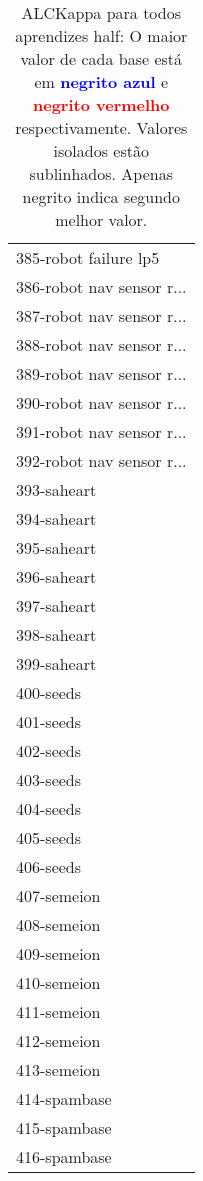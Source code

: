 \begin{table}[h]
\caption{ALCKappa para todos aprendizes half: O maior valor de cada base está em \textcolor{blue}{\textbf{negrito azul}} e \textcolor{red}{\textbf{negrito vermelho}} respectivamente. Valores isolados estão sublinhados. Apenas negrito indica segundo melhor valor.}
\begin{center}\begin{tabular}{l}
 & \\ \hline 385-robot failure lp5 &  \\
386-robot nav sensor r... &  \\
387-robot nav sensor r... &  \\
388-robot nav sensor r... &  \\
389-robot nav sensor r... &  \\
390-robot nav sensor r... &  \\
391-robot nav sensor r... &  \\ \hline
392-robot nav sensor r... &  \\
393-saheart &  \\
394-saheart &  \\
395-saheart &  \\
396-saheart &  \\
397-saheart &  \\
398-saheart &  \\ \hline
399-saheart &  \\
400-seeds &  \\
401-seeds &  \\
402-seeds &  \\
403-seeds &  \\
404-seeds &  \\
405-seeds &  \\ \hline
406-seeds &  \\
407-semeion &  \\
408-semeion &  \\
409-semeion &  \\
410-semeion &  \\
411-semeion &  \\
412-semeion &  \\ \hline
413-semeion &  \\
414-spambase &  \\
415-spambase &  \\
416-spambase &  \\\end{tabular}\label{stratsALCKappa12AllReduxb}
\end{center}
\end{table}

